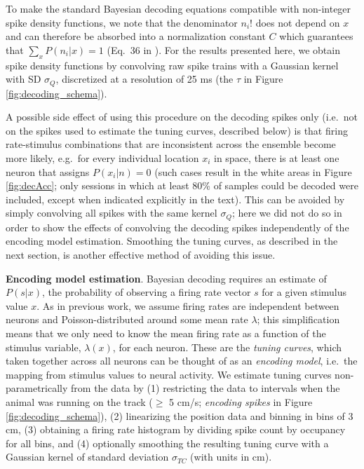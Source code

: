 \documentclass[11pt]{article}
\let\citeNP=\citealt
\begin{document}
To make the standard Bayesian decoding equations compatible with
non-integer spike density functions, we note that the denominator
$n_i!$ does not depend on $x$ and can therefore be absorbed into a
normalization constant $C$ which guarantees that $\sum_{x} P(n_i|x) =
1$ (Eq.\ 36 in \citeNP{Zhang1998}). For the results presented here, we
obtain spike density functions by convolving raw spike trains with a
Gaussian kernel with SD $\sigma_Q$, discretized at a resolution of 25
ms (the $\tau$ in Figure \ref{fig:decoding_schema}).

A possible side effect of using this procedure on the decoding spikes
only (i.e.\ not on the spikes used to estimate the tuning curves,
described below) is that firing rate-stimulus combinations that are
inconsistent across the ensemble become more likely, e.g.\ for every
individual location $x_i$ in space, there is at least one neuron that
assigns $P(x_i|n) = 0$ (such cases result in the white areas in Figure
\ref{fig:decAcc}; only sessions in which at least 80\% of samples
could be decoded were included, except when indicated explicitly in
the text). This can be avoided by simply convolving all spikes with
the same kernel $\sigma_Q$; here we did not do so in order to show the
effects of convolving the decoding spikes independently of the
encoding model estimation. Smoothing the tuning curves, as described
in the next section, is another effective method of avoiding this
issue.

{\bf Encoding model estimation}. Bayesian decoding requires an
estimate of $P(s|x)$, the probability of observing a firing rate
vector $s$ for a given stimulus value $x$. As in previous work, we
assume firing rates are independent between neurons and
Poisson-distributed around some mean rate $\lambda$; this
simplification means that we only need to know the mean firing rate as
a function of the stimulus variable, $\lambda(x)$, for each
neuron. These are the {\it tuning curves}, which taken together across
all neurons can be thought of as an {\it encoding model}, i.e.\ the
mapping from stimulus values to neural activity. We estimate tuning
curves non-parametrically from the data by (1) restricting the data to
intervals when the animal was running on the track ($\ge$ 5 cm/s; {\it
  encoding spikes} in Figure \ref{fig:decoding_schema}), (2)
linearizing the position data and binning in bins of 3 cm, (3)
obtaining a firing rate histogram by dividing spike count by occupancy
for all bins, and (4) optionally smoothing the resulting tuning curve
with a Gaussian kernel of standard deviation $\sigma_{TC}$ (with units
in cm).
\end{document}
